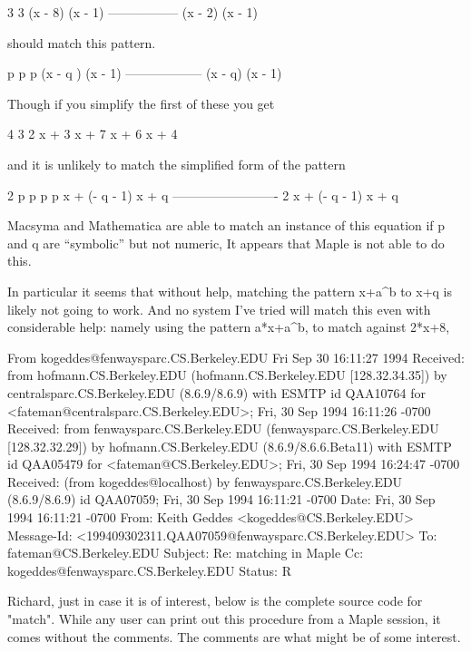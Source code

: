                                  3        3
                               (x  - 8) (x  - 1)
                               -----------------
                                (x - 2) (x - 1)

should match this pattern.

                                 p    p    p
                               (x  - q ) (x  - 1)
                               ------------------
                                 (x - q) (x - 1)


Though if you simplify the first of these you get

			    4	   3	  2
 			   x  + 3 x  + 7 x  + 6 x + 4

and it is unlikely to match the simplified form of the pattern

			    2 p	      p	      p	   p
			   x    + (- q  - 1) x  + q
 			   -------------------------
			      2
			     x  + (- q - 1) x + q


Macsyma and Mathematica
are able to match an instance of this equation if p and q are
``symbolic'' but not numeric, It appears that Maple is not able
to do this.

In particular it seems that without help, matching
the pattern x+a^b  to x+q is likely not going to work.
And no system I've tried will match this even with considerable
help: namely using the pattern a*x+a^b, to match against 2*x+8, 






From kogeddes@fenwaysparc.CS.Berkeley.EDU Fri Sep 30 16:11:27 1994
Received: from hofmann.CS.Berkeley.EDU (hofmann.CS.Berkeley.EDU [128.32.34.35]) by centralsparc.CS.Berkeley.EDU (8.6.9/8.6.9) with ESMTP id QAA10764 for <fateman@centralsparc.CS.Berkeley.EDU>; Fri, 30 Sep 1994 16:11:26 -0700
Received: from fenwaysparc.CS.Berkeley.EDU (fenwaysparc.CS.Berkeley.EDU [128.32.32.29]) by hofmann.CS.Berkeley.EDU (8.6.9/8.6.6.Beta11) with ESMTP id QAA05479 for <fateman@CS.Berkeley.EDU>; Fri, 30 Sep 1994 16:24:47 -0700
Received: (from kogeddes@localhost) by fenwaysparc.CS.Berkeley.EDU (8.6.9/8.6.9) id QAA07059; Fri, 30 Sep 1994 16:11:21 -0700
Date: Fri, 30 Sep 1994 16:11:21 -0700
From: Keith Geddes <kogeddes@CS.Berkeley.EDU>
Message-Id: <199409302311.QAA07059@fenwaysparc.CS.Berkeley.EDU>
To: fateman@CS.Berkeley.EDU
Subject: Re:  matching in Maple
Cc: kogeddes@fenwaysparc.CS.Berkeley.EDU
Status: R

Richard, just in case it is of interest, below is the complete source code
for "match".  While any user can print out this procedure from a Maple
session, it comes without the comments.
The comments are what might be of some interest.

